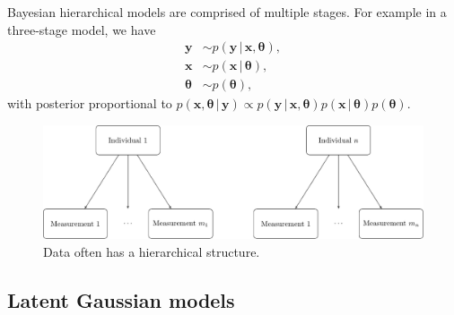 \documentclass[a4paper, nobind]{templates/ociamthesis}
\newcommand{\x}{\mathbf{x}}
\newcommand{\y}{\mathbf{y}}
\newcommand{\btheta}{\bm{\theta}}
\begin{document}
Bayesian hierarchical models are comprised of multiple stages.
For example in a three-stage model, we have
\begin{align}
\y &\sim p(\y \, | \, \x, \btheta), \\
\x &\sim p(\x \, | \, \btheta), \\
\btheta &\sim p(\btheta),
\end{align}
with posterior proportional to \(p(\x, \btheta \, | \, \y) \propto p(\y \, | \, \x, \btheta) p(\x \, | \, \btheta) p(\btheta)\).

\begin{figure}

{\centering \includegraphics[width=0.95\linewidth]{figures/hierarchical-structure} 

}

\caption{Data often has a hierarchical structure.}\label{fig:hierarchical-structure}
\end{figure}

\hypertarget{latent-gaussian-models}{%
\subsection{Latent Gaussian models}\label{latent-gaussian-models}}
\end{document}
